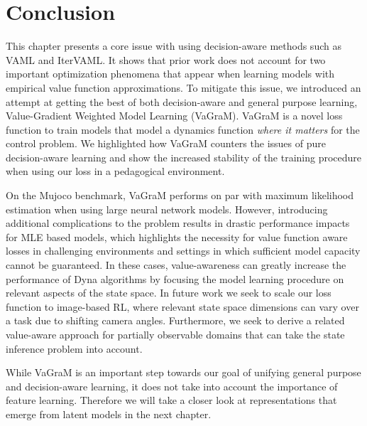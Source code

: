 \section{Conclusion}
This chapter presents a core issue with using decision-aware methods such as VAML and IterVAML.
It shows that prior work does not account for two important optimization phenomena that appear when learning models with empirical value function approximations.
To mitigate this issue, we introduced an attempt at getting the best of both decision-aware and general purpose learning, Value-Gradient Weighted Model Learning (VaGraM).
VaGraM is a novel loss function to train models that model a dynamics function \emph{where it matters} for the control problem.
We highlighted how VaGraM counters the issues of pure decision-aware learning and show the increased stability of the training procedure when using our loss in a pedagogical environment.

On the Mujoco benchmark, VaGraM performs on par with maximum likelihood estimation when using large neural network models.
However, introducing additional complications to the problem results in drastic performance impacts for MLE based models, which highlights the necessity for value function aware losses in challenging environments and settings in which sufficient model capacity cannot be guaranteed.
In these cases, value-awareness can greatly increase the performance of Dyna algorithms by focusing the model learning procedure on relevant aspects of the state space.
In future work we seek to scale our loss function to image-based RL, where relevant state space dimensions can vary over a task due to shifting camera angles. 
Furthermore, we seek to derive a related value-aware approach for partially observable domains that can take the state inference problem into account.

While VaGraM is an important step towards our goal of unifying general purpose and decision-aware learning, it does not take into account the importance of feature learning.
Therefore we will take a closer look at representations that emerge from latent models in the next chapter.
